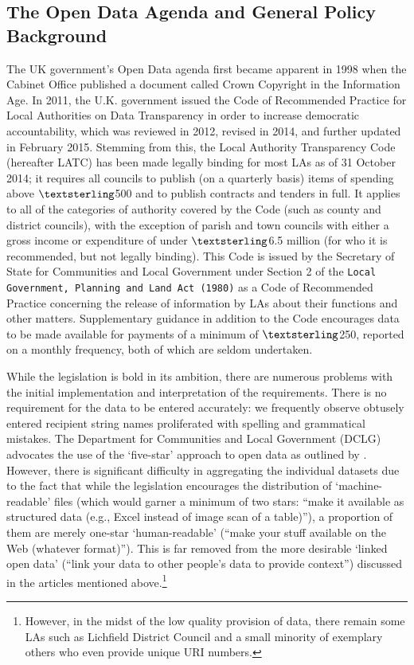 \documentclass[12pt]{article}
\begin{document}
\subsection{The Open Data Agenda and General Policy Background}

The UK government's Open Data agenda first became apparent in 1998 when the Cabinet Office published a document called Crown Copyright in the Information Age. In 2011, the U.K. government issued the Code of Recommended Practice for Local Authorities on Data Transparency in order to increase democratic accountability, which was reviewed in 2012, revised in 2014, and further updated in February 2015. Stemming from this, the Local Authority Transparency Code (hereafter LATC) has been made legally binding for most LAs as of 31 October 2014; it requires all councils to publish (on a quarterly basis) items of spending above $\textsterling$500 and to publish contracts and tenders in full. It applies to all of the categories of authority covered by the Code (such as county and district councils), with the exception of parish and town councils with either a gross income or expenditure of under $\textsterling$6.5 million (for who it is recommended, but not legally binding). This Code is issued by the Secretary of State for Communities and Local Government under Section 2 of the \texttt{Local Government, Planning and Land Act (1980)} as a Code of Recommended Practice concerning the release of information by LAs about their functions and other matters. Supplementary guidance in addition to the Code encourages data to be made available for payments of a minimum of $\textsterling$250, reported on a monthly frequency, both of which are seldom undertaken. 

While the legislation is bold in its ambition, there are numerous problems with the initial implementation and interpretation of the requirements. There is no requirement for the data to be entered accurately: we frequently observe obtusely entered recipient string names proliferated with spelling and grammatical mistakes.  The Department for Communities and Local Government (DCLG) advocates the use of the `five-star' approach to open data as outlined by \cite{sirtim}. However, there is significant difficulty in aggregating the individual datasets due to the fact that while the legislation encourages the distribution of `machine-readable' files (which would garner a minimum of two stars: ``make it available as structured data (e.g., Excel instead of image scan of a table)''), a proportion of them are merely one-star `human-readable' (``make your stuff available on the Web (whatever format)''). This is far removed from the more desirable `linked open data' (``link your data to other people's data to provide context'')  discussed in the articles mentioned above.\footnote{However, in the midst of the low quality provision of data, there remain some LAs such as Lichfield District Council and a small minority of exemplary others who even provide unique URI numbers.} 
\end{document}
